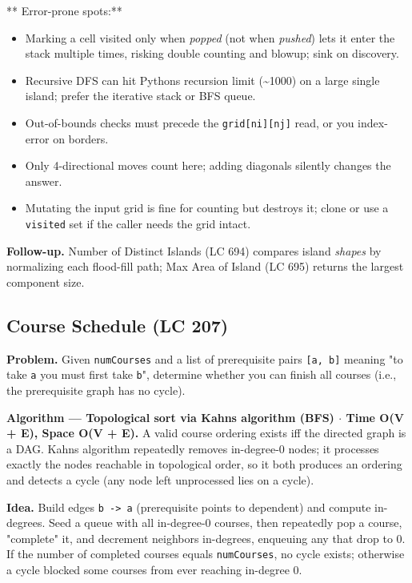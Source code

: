 \documentclass[11pt]{article}
\providecommand{\tightlist}{\setlength{\itemsep}{1pt}\setlength{\parskip}{0pt}}
\begin{document}
** Error-prone spots:**

\begin{itemize}
\tightlist
\item
  Marking a cell visited only when \emph{popped} (not when \emph{pushed}) lets it enter the stack multiple times, risking double counting and blowup; sink on discovery.
\item
  Recursive DFS can hit Python\textquotesingle s recursion limit (\textasciitilde1000) on a large single island; prefer the iterative stack or BFS queue.
\item
  Out-of-bounds checks must precede the \texttt{grid{[}ni{]}{[}nj{]}} read, or you index-error on borders.
\item
  Only 4-directional moves count here; adding diagonals silently changes the answer.
\item
  Mutating the input grid is fine for counting but destroys it; clone or use a \texttt{visited} set if the caller needs the grid intact.
\end{itemize}

\textbf{Follow-up.} Number of Distinct Islands (LC 694) compares island \emph{shapes} by normalizing each flood-fill path; Max Area of Island (LC 695) returns the largest component size.

\subsection{Course Schedule (LC 207)}\label{course-schedule-lc-207}

\textbf{Problem.} Given \texttt{numCourses} and a list of prerequisite pairs \texttt{{[}a,\ b{]}} meaning "to take \texttt{a} you must first take \texttt{b}", determine whether you can finish all courses (i.e., the prerequisite graph has no cycle).

\textbf{Algorithm --- Topological sort via Kahn\textquotesingle s algorithm (BFS) \(\cdot\) Time O(V + E), Space O(V + E).} A valid course ordering exists iff the directed graph is a DAG. Kahn\textquotesingle s algorithm repeatedly removes in-degree-0 nodes; it processes exactly the nodes reachable in topological order, so it both produces an ordering and detects a cycle (any node left unprocessed lies on a cycle).

\textbf{Idea.} Build edges \texttt{b\ -\textgreater{}\ a} (prerequisite points to dependent) and compute in-degrees. Seed a queue with all in-degree-0 courses, then repeatedly pop a course, "complete" it, and decrement neighbors\textquotesingle{} in-degrees, enqueuing any that drop to 0. If the number of completed courses equals \texttt{numCourses}, no cycle exists; otherwise a cycle blocked some courses from ever reaching in-degree 0.
\end{document}
